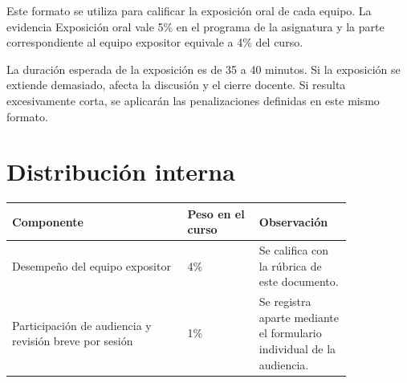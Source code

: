 \documentclass[11pt]{article}
\begin{document}

\begin{infobox}
Este formato se utiliza para calificar la exposición oral de cada equipo. La evidencia Exposición oral vale 5\% en el programa de la asignatura y la parte correspondiente al equipo expositor equivale a 4\% del curso.
\end{infobox}

\begin{warnbox}
La duración esperada de la exposición es de 35 a 40 minutos. Si la exposición se extiende demasiado, afecta la discusión y el cierre docente. Si resulta excesivamente corta, se aplicarán las penalizaciones definidas en este mismo formato.
\end{warnbox}

\section{Distribución interna}
\begin{center}
\begin{tabular}{p{0.44\linewidth} p{0.18\linewidth} p{0.22\linewidth}}
\toprule
\textbf{Componente} & \textbf{Peso en el curso} & \textbf{Observación} \\
\midrule
Desempeño del equipo expositor & 4\% & Se califica con la rúbrica de este documento. \\
Participación de audiencia y revisión breve por sesión & 1\% & Se registra aparte mediante el formulario individual de la audiencia. \\
\bottomrule
\end{tabular}
\end{center}
\end{document}
